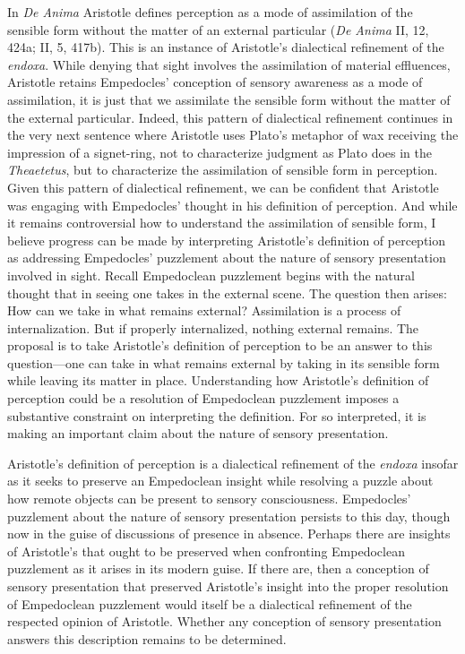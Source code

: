 \documentclass[12pt]{article}
\begin{document}
In \emph{De Anima} Aristotle defines perception as a mode of assimilation of the sensible form without the matter of an external particular (\emph{De Anima} II, 12, 424a; II, 5, 417b). This is an instance of Aristotle's dialectical refinement of the \emph{endoxa}. While denying that sight involves the assimilation of material effluences, Aristotle retains Empedocles' conception of sensory awareness as a mode of assimilation, it is just that we assimilate the sensible form without the matter of the external particular. Indeed, this pattern of dialectical refinement continues in the very next sentence where Aristotle uses Plato's metaphor of  wax receiving the impression of a signet-ring, not to characterize judgment as Plato does in the \emph{Theaetetus}, but to characterize the assimilation of sensible form in perception. Given this pattern of dialectical refinement, we can be confident that Aristotle was engaging with Empedocles' thought in his definition of perception. And while it remains controversial how to understand the assimilation of sensible form, I believe progress can be made by interpreting Aristotle's definition of perception as addressing Empedocles' puzzlement about the nature of sensory presentation involved in sight. Recall Empedoclean puzzlement begins with the natural thought that in seeing one takes in the external scene. The question then arises: How can we take in what remains external? Assimilation is a process of internalization. But if properly internalized, nothing external remains. The proposal is to take Aristotle's definition of perception to be an answer to this question---one can take in what remains external by taking in its sensible form while leaving its matter in place. Understanding how Aristotle's definition of perception could be a resolution of Empedoclean puzzlement imposes a substantive constraint on interpreting the definition. For so interpreted, it is making an important claim about the nature of sensory presentation.

Aristotle's definition of perception is a dialectical refinement of the \emph{endoxa} insofar as it seeks to preserve an Empedoclean insight while resolving a puzzle about how remote objects can be present to sensory consciousness. Empedocles' puzzlement about the nature of sensory presentation persists to this day, though now in the guise of discussions of presence in absence. Perhaps there are insights of Aristotle's that ought to be preserved when confronting Empedoclean puzzlement as it arises in its modern guise. If there are, then a conception of sensory presentation that preserved Aristotle's insight into the proper resolution of Empedoclean puzzlement would itself be a dialectical refinement of the respected opinion of Aristotle. Whether any conception of sensory presentation answers this description remains to be determined.
\end{document}

